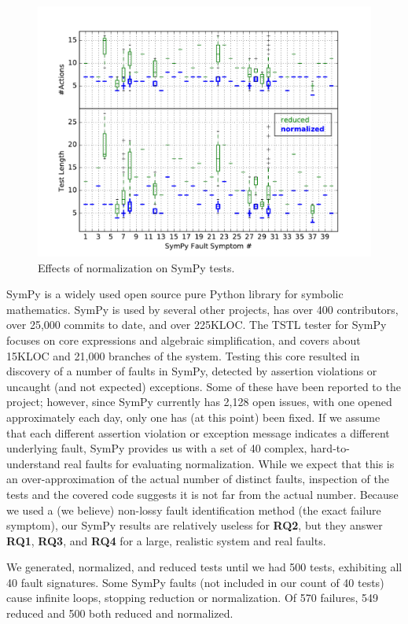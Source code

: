 \begin{figure}
\includegraphics[width=\columnwidth]{sympyd}
\caption{Effects of normalization on SymPy tests.}
\label{lengthandactions}
\end{figure}

SymPy \cite{SymPy} is a widely used open source pure Python library
for symbolic mathematics.  SymPy is used by several other projects,
has over 400 contributors, over 25,000 commits to date, and over
225KLOC.  The TSTL tester for SymPy focuses on core expressions and
algebraic simplification, and covers about 15KLOC and 21,000 branches of
the system.  Testing this core resulted in discovery of a number
of faults in SymPy, detected by assertion violations or uncaught (and
not expected) exceptions.  Some of these have been reported to the project;
however, since SymPy currently has 2,128 open issues, with one opened
approximately each day, only one has (at this point) been fixed.  If we assume that
each different assertion violation or exception message indicates a
different underlying fault, SymPy provides us with a set of 40
complex, hard-to-understand real faults for evaluating normalization.
While we expect that this is an over-approximation of the actual
number of distinct faults, inspection of the tests and the covered
code suggests it is not far from the actual number.  Because we used a
(we believe)
non-lossy fault identification method (the exact failure symptom), our
SymPy results are relatively useless for {\bf RQ2}, but they answer {\bf RQ1}, {\bf RQ3}, and {\bf RQ4} for a large, realistic
system and real faults.

We generated, normalized, and reduced tests until we had 500 tests,
exhibiting all 40 fault signatures.    Some SymPy faults (not
included in our count of 40 tests) cause infinite loops, stopping
reduction or normalization. Of 570 failures, 549 reduced
and 500 both reduced and normalized.

